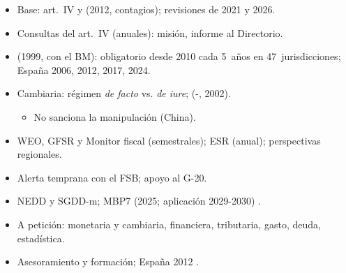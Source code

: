 \documentclass{article}
\begin{document}
\begin{columnas}
\begin{itemize}
\item Base: art.~IV y  (2012, contagios); revisiones de 2021 y 2026.
\end{itemize}
\begin{itemize}
\item Consultas del art.~IV (anuales): misión, informe al Directorio.
\item {} (1999, con el BM): obligatorio desde 2010 cada 5~años en 47~jurisdicciones; España 2006, 2012, 2017, 2024.
\item Cambiaria: régimen \emph{de facto} vs. \emph{de iure};  (-, 2002).
  \begin{itemize}
  \item No sanciona la manipulación (China).
  \end{itemize}
\end{itemize}
\begin{itemize}
\item WEO, GFSR y Monitor fiscal (semestrales); ESR (anual); perspectivas regionales.
\item Alerta temprana con el FSB; apoyo al G-20.
\end{itemize}
\begin{itemize}
\item NEDD y SGDD-m; MBP7 (2025; aplicación 2029-2030) .
\end{itemize}

\begin{itemize}
\item A petición: monetaria y cambiaria, financiera, tributaria, gasto, deuda, estadística.
\item Asesoramiento y formación; España 2012 .
\end{itemize}


\end{columnas}
\end{document}
